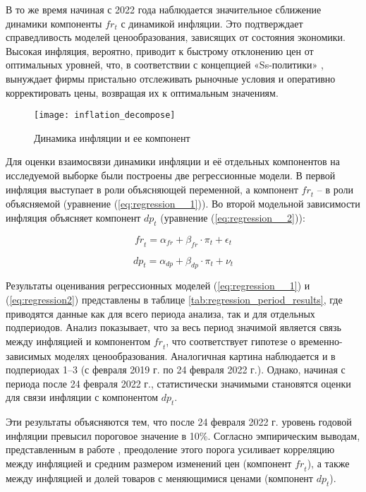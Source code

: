 В то же время начиная с 2022 года наблюдается значительное сближение динамики компоненты $fr_t$ с динамикой инфляции. Это подтверждает справедливость моделей ценообразования, зависящих от состояния экономики. Высокая инфляция, вероятно, приводит к быстрому отклонению цен от оптимальных уровней, что, в соответствии с концепцией «Ss-политики» \cite{SheshinskiWeiss1977, Sheshinski1983}, вынуждает фирмы пристально отслеживать рыночные условия и оперативно корректировать цены, возвращая их к оптимальным значениям.

\begin{figure}[h]
	\centering
	\texttt{[image: inflation\_decompose]}
	\caption{Динамика инфляции и ее компонент}
	\label{fig:inflation_decompose}
\end{figure}

Для оценки взаимосвязи динамики инфляции и её отдельных компонентов на исследуемой выборке были построены две регрессионные модели. В первой инфляция выступает в роли объясняющей переменной, а компонент $\textit{fr}_{t}$ – в роли объясняемой (уравнение (\ref{eq:regression__1})). Во второй модельной зависимости инфляция объясняет компонент $\textit{dp}_{t}$ (уравнение (\ref{eq:regression__2})):

\begin{equation}
	\textit{fr}_{t} = \alpha_{fr} + \beta_{fr} \cdot \pi_{t} + \epsilon_{t}
	\label{eq:regression__1}
\end{equation}

\begin{equation}
	\textit{dp}_{t} = \alpha_{dp} + \beta_{dp} \cdot \pi_{t} + \nu_{t}
	\label{eq:regression__2}
\end{equation}

Результаты оценивания регрессионных моделей (\ref{eq:regression__1}) и (\ref{eq:regression2}) представлены в таблице \ref{tab:regression_period_results}, где приводятся данные как для всего периода анализа, так и для отдельных подпериодов. Анализ показывает, что за весь период значимой является связь между инфляцией и компонентом $\textit{fr}_{t}$, что соответствует гипотезе о временно-зависимых моделях ценообразования. Аналогичная картина наблюдается и в подпериодах 1–3 (с февраля 2019 г. по 24 февраля 2022 г.). Однако, начиная с периода после 24 февраля 2022 г., статистически значимыми становятся оценки для связи инфляции с компонентом $\textit{dp}_{t}$.

Эти результаты объясняются тем, что после 24 февраля 2022 г. уровень годовой инфляции превысил пороговое значение в 10\%. Согласно эмпирическим выводам, представленным в работе \cite{gagnon2009}, преодоление этого порога усиливает корреляцию между инфляцией и средним размером изменений цен (компонент $\textit{fr}_{t}$), а также между инфляцией и долей товаров с меняющимися ценами (компонент $\textit{dp}_{t}$).

